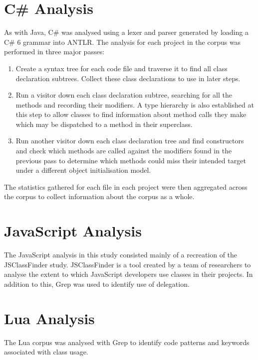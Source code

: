 \section{C\# Analysis}
As with Java, C\# was analysed using a lexer and parser generated by loading a C\# 6 grammar into ANTLR. The analysis for each project in the corpus was performed in three major passes:
\begin{enumerate}
	\item Create a syntax tree for each code file and traverse it to find all class declaration subtrees. Collect these class declarations to use in later steps.
	\item Run a visitor down each class declaration subtree, searching for all the methods and recording their modifiers. A type hierarchy is also established at this step to allow classes to find information about method calls they make which may be dispatched to a method in their superclass.
	\item Run another visitor down each class declaration tree and find constructors and check which methods are called against the modifiers found in the previous pass to determine which methods could miss their intended target under a different object initialisation model.
\end{enumerate}
The statistics gathered for each file in each project were then aggregated across the corpus to collect information about the corpus as a whole.

\section{JavaScript Analysis}
The JavaScript analysis in this study consisted mainly of a recreation of the JSClassFinder study. JSClassFinder is a tool created by a team of researchers to analyse the extent to which JavaScript developers use classes in their projects. In addition to this, Grep was used to identify use of delegation.

\section{Lua Analysis}
The Lua corpus was analysed with Grep to identify code patterns and keywords associated with class usage.






